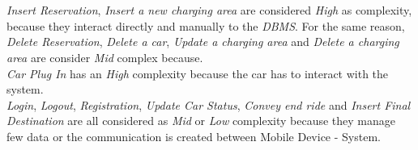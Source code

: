 \documentclass[11pt,a4paper]{report}
\begin{document}
\\\\
\textit{Insert Reservation}, \textit{Insert a new charging area} are considered \textit{High} as complexity, because they interact directly and manually to the \textit{DBMS}. For the same reason, \textit{Delete Reservation}, \textit{Delete a car}, \textit{Update a charging area} and \textit{Delete a charging area} are consider \textit{Mid} complex because.\\
\textit{Car Plug In} has an \textit{High} complexity because the car has to interact with the system.\\
\textit{Login}, \textit{Logout}, \textit{Registration}, \textit{Update Car Status}, \textit{Convey end ride} and \textit{Insert Final Destination} are all considered as \textit{Mid} or \textit{Low} complexity because they manage few data or the communication is created between Mobile Device - System.
\end{document}
